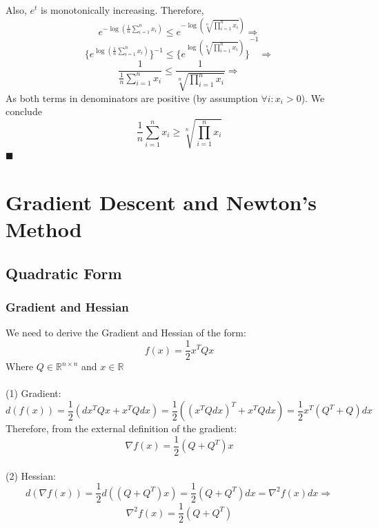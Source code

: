 \documentclass[12pt]{article}
\newcommand{\qed}{\hfill$\blacksquare$}
\begin{document}
Also, $e^t$ is monotonically increasing. Therefore,
$$e^{-\log(\frac{1}{n} \sum_{i=1}^n x_i)} \leq e^{-\log(\sqrt[n]{\prod_{i=1}^n x_i})} \Rightarrow$$
$$\{e^{\log{(\frac{1}{n} \sum_{i=1}^n x_i)}}\}^{-1} \leq {\{e^{\log(\sqrt[n]{\prod_{i=1}^n x_i})}\}}^{-1} \Rightarrow$$
$$\frac{1}{\frac{1}{n} \sum_{i=1}^n x_i} \leq \frac{1}{\sqrt[n]{\prod_{i=1}^n x_i}}\Rightarrow$$
As both terms in denominators are positive (by assumption $\forall i : x_i > 0$). We conclude\\
$$\frac{1}{n} \sum_{i=1}^n x_i \geq \sqrt[n]{\prod_{i=1}^n x_i}$$
\qed

\newpage

\section{Gradient Descent
and Newton’s Method}

\subsection{Quadratic Form}

\subsubsection{Gradient and Hessian}
We need to derive the Gradient and Hessian of the form:
$$f(x)=\frac{1}{2} x^T Q x$$
Where $Q \in \mathbb{R}^{n \times n}$ and $x \in \mathbb{R}$\\
\\
(1) Gradient: $$d(f(x)) = \frac{1}{2}(dx^T Q x + x^T Q dx) = \frac{1}{2}((x^T Q dx)^T + x^T Q dx) = \frac{1}{2} x^T (Q^T + Q) dx$$
Therefore, from the external definition of the gradient:
$$\nabla f(x) = \frac{1}{2} (Q + Q^T)x$$
\\
(2) Hessian:\\
$$d(\nabla f(x)) =  \frac{1}{2} d((Q + Q^T)x) = \frac{1}{2} (Q + Q^T)dx = \nabla^2 f(x) dx \Rightarrow$$
$$\nabla^2 f(x) = \frac{1}{2} (Q + Q^T)$$
\end{document}
